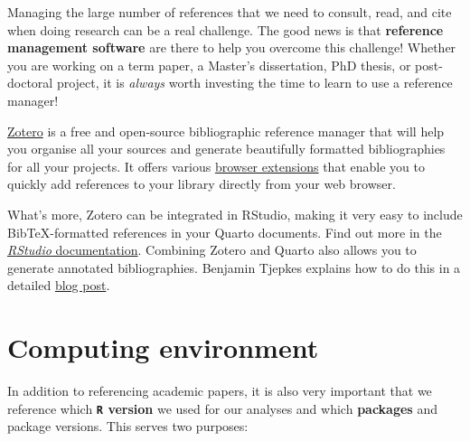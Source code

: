 \documentclass[
  letterpaper,
  DIV=11,
  numbers=noendperiod]{scrreprt}
\begin{document}
\begin{tcolorbox}[enhanced jigsaw, arc=.35mm, bottomrule=.15mm, bottomtitle=1mm, breakable, colback=white, colbacktitle=quarto-callout-tip-color!10!white, colframe=quarto-callout-tip-color-frame, coltitle=black, left=2mm, leftrule=.75mm, opacityback=0, opacitybacktitle=0.6, rightrule=.15mm, title=\textcolor{quarto-callout-tip-color}{\faLightbulb}\hspace{0.5em}{Literature management \emoji{books}}, titlerule=0mm, toprule=.15mm, toptitle=1mm]

Managing the large number of references that we need to consult, read,
and cite when doing research can be a real challenge. The good news is
that \textbf{reference management software} are there to help you
overcome this challenge! Whether you are working on a term paper, a
Master's dissertation, PhD thesis, or post-doctoral project, it is
\emph{always} worth investing the time to learn to use a reference
manager!

\href{https://www.zotero.org/}{Zotero} is a free and open-source
bibliographic reference manager that will help you organise all your
sources and generate beautifully formatted bibliographies for all your
projects. It offers various
\href{https://www.zotero.org/download/}{browser extensions} that enable
you to quickly add references to your library directly from your web
browser.

What's more, Zotero can be integrated in RStudio, making it very easy to
include BibTeX-formatted references in your Quarto documents. Find out
more in the
\href{https://rstudio.github.io/visual-markdown-editing/citations.html}{\emph{RStudio}
documentation}. Combining Zotero and Quarto also allows you to generate
annotated bibliographies. Benjamin Tjepkes explains how to do this in a
detailed
\href{https://btjepkes.github.io/posts/building-annotated-bibliographies-with-quarto/}{blog
post}.

\end{tcolorbox}

\section{Computing environment}\label{sec-Packages}

In addition to referencing academic papers, it is also very important
that we reference which \textbf{\texttt{R} version} we used for our
analyses and which \textbf{packages} and package versions. This serves
two purposes:
\end{document}

